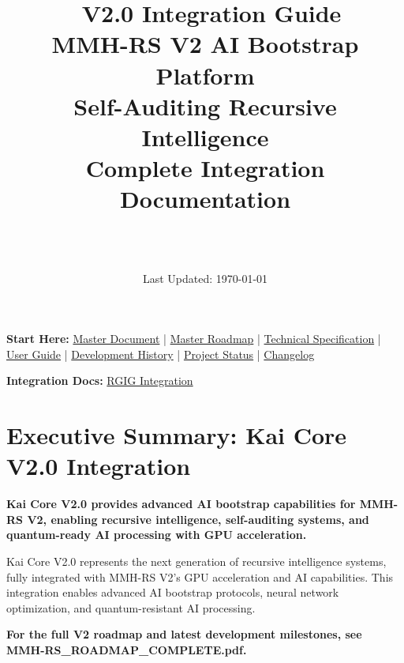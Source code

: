 \documentclass[12pt,a4paper]{article}
\title{\Huge\textbf{\project\ V2.0 Integration Guide}\\[0.5cm]
\Large\textbf{MMH-RS V2 AI Bootstrap Platform}\\[0.3cm]
\large Self-Auditing Recursive Intelligence\\[0.5cm]
\large Complete Integration Documentation}
\author{\Large\authorname\\[0.2cm]\email\\[0.2cm]\github}
\date{\large Last Updated: \today}
\begin{document}
\maketitle
\thispagestyle{empty}

\begin{tcolorbox}[colback=blue!10,colframe=blue!50,title=\textbf{Full Documentation Suite}]
\textbf{Start Here:} \href{MMH-RS_MASTER_DOCUMENT.pdf}{Master Document} | \href{MMH-RS_ROADMAP_COMPLETE.pdf}{Master Roadmap} | \href{MMH-RS_TECHNICAL_COMPLETE.pdf}{Technical Specification} | \href{USER_GUIDE.md}{User Guide} | \href{DEVELOPMENT_HISTORY.md}{Development History} | \href{PROJECT_STATUS.md}{Project Status} | \href{CHANGELOG.md}{Changelog}

\textbf{Integration Docs:} \href{RGIG_INTEGRATION_COMPLETE.pdf}{RGIG Integration}
\end{tcolorbox}

\tableofcontents
\newpage

\section{Executive Summary: Kai Core V2.0 Integration}

\begin{tcolorbox}[colback=v2blue!10,colframe=v2blue!50,title=\textbf{Kai Core V2.0 Integration Summary}]
\textbf{Kai Core V2.0 provides advanced AI bootstrap capabilities for MMH-RS V2, enabling recursive intelligence, self-auditing systems, and quantum-ready AI processing with GPU acceleration.}

Kai Core V2.0 represents the next generation of recursive intelligence systems, fully integrated with MMH-RS V2's GPU acceleration and AI capabilities. This integration enables advanced AI bootstrap protocols, neural network optimization, and quantum-resistant AI processing.
\end{tcolorbox}

\textbf{For the full V2 roadmap and latest development milestones, see MMH-RS\_ROADMAP\_COMPLETE.pdf.}
\end{document}
